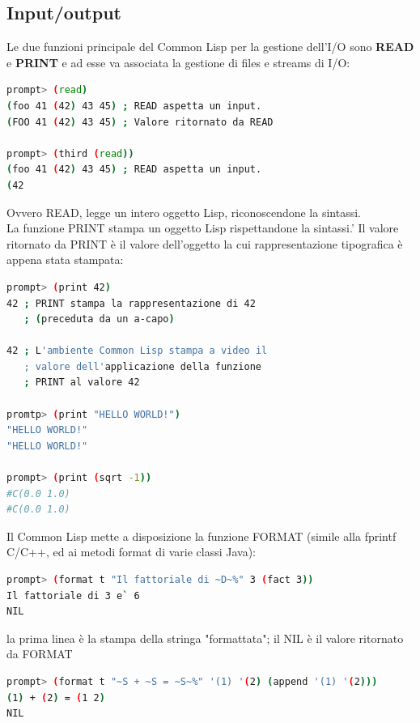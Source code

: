 \documentclass[a4paper,12pt, oneside]{book}
\begin{document}
\subsection{Input/output}
Le due funzioni principale del Common Lisp per la gestione
dell'I/O sono \textbf{READ} e \textbf{PRINT} e ad esse va associata la gestione di files e streams di I/O:
\begin{shaded}
\begin{lstlisting}[language=bash]
prompt> (read)
(foo 41 (42) 43 45) ; READ aspetta un input.
(FOO 41 (42) 43 45) ; Valore ritornato da READ

prompt> (third (read))
(foo 41 (42) 43 45) ; READ aspetta un input.
(42
\end{lstlisting}
\end{shaded}
Ovvero READ, legge un intero oggetto Lisp,
riconoscendone la sintassi.\\La funzione PRINT stampa un oggetto Lisp rispettandone la sintassi.'
Il valore ritornato da PRINT è il valore dell'oggetto la cui rappresentazione tipografica è
appena stata stampata:
\begin{shaded}
\begin{lstlisting}[language=bash]
prompt> (print 42)
42 ; PRINT stampa la rappresentazione di 42
   ; (preceduta da un a-capo)

42 ; L'ambiente Common Lisp stampa a video il
   ; valore dell'applicazione della funzione
   ; PRINT al valore 42
   
promtp> (print "HELLO WORLD!")
"HELLO WORLD!"
"HELLO WORLD!"

prompt> (print (sqrt -1))
#C(0.0 1.0)
#C(0.0 1.0) 
\end{lstlisting}
\end{shaded}
Il Common Lisp mette a disposizione la funzione FORMAT (simile alla
fprintf C/C++, ed ai metodi format di varie classi Java):
\begin{shaded}
\begin{lstlisting}[language=bash]
prompt> (format t "Il fattoriale di ~D~%" 3 (fact 3))
Il fattoriale di 3 e` 6
NIL
\end{lstlisting}
\end{shaded}
la prima linea è la stampa della stringa "formattata"; il NIL è il valore
ritornato da FORMAT
\begin{shaded}
\begin{lstlisting}[language=bash]
prompt> (format t "~S + ~S = ~S~%" '(1) '(2) (append '(1) '(2)))
(1) + (2) = (1 2)
NIL
\end{lstlisting}
\end{shaded}
\end{document}
